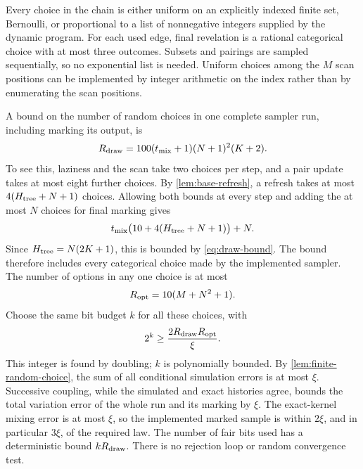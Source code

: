 \documentclass[11pt]{article}
\theoremstyle{definition}
\theoremstyle{remark}
\numberwithin{equation}{section}
\begin{document}
Every choice in the chain is either uniform on an explicitly indexed
finite set, Bernoulli, or proportional to a list of nonnegative
integers supplied by the dynamic program. For each used edge, final
revelation is a rational categorical choice with at most three outcomes.
Subsets and pairings are sampled sequentially, so no exponential list is needed. Uniform choices
among the $M$ scan positions can be implemented by integer arithmetic
on the index rather than by enumerating the scan positions.

A bound on the number of random choices in one complete sampler run,
including marking its output, is
\begin{equation}\label{eq:draw-bound}
 R_{\rm draw}=100(t_{\rm mix}+1)(N+1)^2(K+2).
\end{equation}
To see this, laziness and the scan take two choices per step, and a
pair update takes at most eight further choices. By
\cref{lem:base-refresh}, a refresh takes at most
$4(H_{\rm tree}+N+1)$ choices. Allowing both bounds at every step
and adding the at most $N$ choices for final marking gives
\[
 t_{\rm mix}\bigl(10+4(H_{\rm tree}+N+1)\bigr)+N.
\]
Since $H_{\rm tree}=N(2K+1)$, this is bounded by
\eqref{eq:draw-bound}. The bound therefore includes every categorical
choice made by the implemented sampler.
The number of options in any one choice is at most
\begin{equation}\label{eq:option-bound}
 R_{\rm opt}=10(M+N^2+1).
\end{equation}
Choose the same bit budget $k$ for all these choices, with
\begin{equation}\label{eq:coin-precision}
 2^k\ge\frac{2R_{\rm draw}R_{\rm opt}}\xi.
\end{equation}
This integer is found by doubling; $k$ is polynomially bounded.
By \cref{lem:finite-random-choice}, the sum of all conditional
simulation errors is at most $\xi$. Successive coupling, while the
simulated and exact histories agree, bounds the total variation error
of the whole run and its marking by $\xi$. The exact-kernel mixing
error is at most $\xi$, so the implemented marked sample is within
$2\xi$, and in particular $3\xi$, of the required law.
The number of fair bits used has a deterministic bound
$kR_{\rm draw}$. There is no rejection loop or random convergence test.
\end{document}

